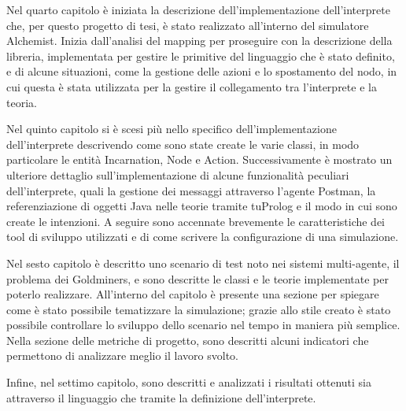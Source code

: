 Nel quarto capitolo è iniziata la descrizione dell'implementazione dell'interprete che, per questo progetto di tesi, è stato realizzato all'interno del simulatore Alchemist.
Inizia dall'analisi del mapping per proseguire con la descrizione della libreria, implementata per gestire le primitive del linguaggio che è stato definito, e di alcune situazioni, come la gestione delle azioni e lo spostamento del nodo, in cui questa è stata utilizzata per la gestire il collegamento tra l'interprete e la teoria.

Nel quinto capitolo si è scesi più nello specifico dell'implementazione dell'interprete descrivendo come sono state create le varie classi, in modo particolare le entità Incarnation, Node e Action.
Successivamente è mostrato un ulteriore dettaglio sull'implementazione di alcune funzionalità peculiari dell'interprete, quali la gestione dei messaggi attraverso l'agente Postman, la referenziazione di oggetti Java nelle teorie tramite tuProlog e il modo in cui sono create le intenzioni.
A seguire sono accennate brevemente le caratteristiche dei tool di sviluppo utilizzati e di come scrivere la configurazione di una simulazione.

Nel sesto capitolo è descritto uno scenario di test noto nei sistemi multi-agente, il problema dei Goldminers, e sono descritte le classi e le teorie implementate per poterlo realizzare.
All'interno del capitolo è presente una sezione per spiegare come è stato possibile tematizzare la simulazione; grazie allo stile creato è stato possibile controllare lo sviluppo dello scenario nel tempo in maniera più semplice.
Nella sezione delle metriche di progetto, sono descritti alcuni indicatori che permettono di analizzare meglio il lavoro svolto.

Infine, nel settimo capitolo, sono descritti e analizzati i risultati ottenuti sia attraverso il linguaggio che tramite la definizione dell'interprete.
